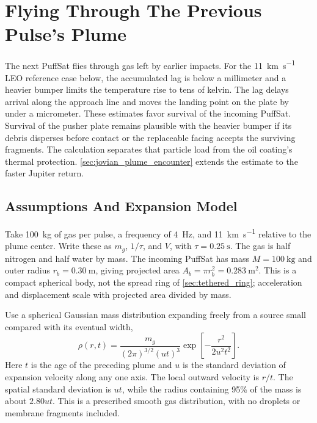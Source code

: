 \documentclass{article}
\begin{document}
\section{Flying Through The Previous Pulse's Plume}\label{sec:leo_plume_encounter}
The next PuffSat flies through gas left by earlier impacts. For the \SI{11}{\kilo\meter\per\second} LEO reference case below, the accumulated lag is below a millimeter and a heavier bumper limits the temperature rise to tens of kelvin. The lag delays arrival along the approach line and moves the landing point on the plate by under a micrometer. These estimates favor survival of the incoming PuffSat. Survival of the pusher plate remains plausible with the heavier bumper if its debris disperses before contact or the replaceable facing accepts the surviving fragments. The calculation separates that particle load from the oil coating's thermal protection. \autoref{sec:jovian_plume_encounter} extends the estimate to the faster Jupiter return.

\subsection{Assumptions And Expansion Model}
Take \SI{100}{\kilogram} of gas per pulse, a frequency of \SI{4}{\hertz}, and \SI{11}{\kilo\meter\per\second} relative to the plume center. Write these as $m_g$, $1/\tau$, and $V$, with $\tau=\SI{0.25}{\second}$. The gas is half nitrogen and half water by mass. The incoming PuffSat has mass $M=\SI{100}{\kilogram}$ and outer radius $r_b=\SI{0.30}{\meter}$, giving projected area $A_b=\pi r_b^2=\SI{0.283}{\square\meter}$. This is a compact spherical body, not the spread ring of \autoref{sec:tethered_ring}; acceleration and displacement scale with projected area divided by mass.

Use a spherical Gaussian mass distribution expanding freely from a source small compared with its eventual width,
\begin{equation}\label{eq:leo_plume_density}
\rho(r,t)=\frac{m_g}{(2\pi)^{3/2}(ut)^3}
\exp\!\left[-\frac{r^2}{2u^2t^2}\right].
\end{equation}
Here $t$ is the age of the preceding plume and $u$ is the standard deviation of expansion velocity along any one axis. The local outward velocity is $r/t$. The spatial standard deviation is $ut$, while the radius containing 95\% of the mass is about $2.80ut$. This is a prescribed smooth gas distribution, with no droplets or membrane fragments included.
\end{document}
